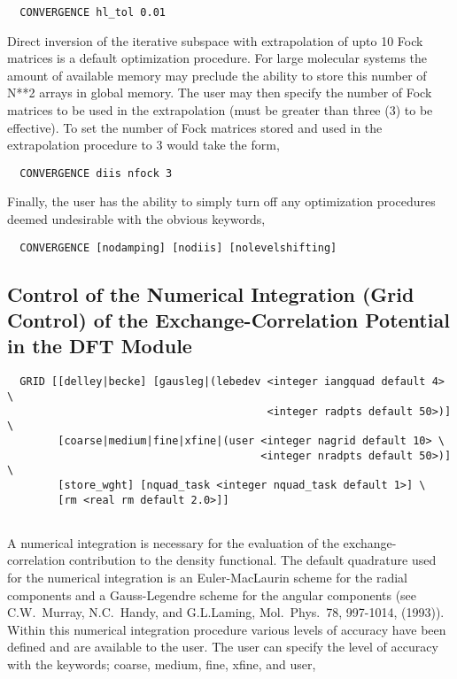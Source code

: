 \begin{verbatim}
  CONVERGENCE hl_tol 0.01
\end{verbatim}

Direct inversion of the iterative subspace with extrapolation of upto
10 Fock matrices is a default optimization procedure.  For large
molecular systems the amount of available memory may preclude the ability to
store this number of N**2 arrays in global memory.  The user may then
specify the number of Fock matrices to be used in the extrapolation
(must be greater than three (3) to be effective).  To set the number of
Fock matrices stored and used in the extrapolation procedure to 3
would take the form,

\begin{verbatim}
  CONVERGENCE diis nfock 3
\end{verbatim}

Finally, the user has the ability to simply turn off any optimization
procedures deemed undesirable with the obvious keywords,
\begin{verbatim}
  CONVERGENCE [nodamping] [nodiis] [nolevelshifting]
\end{verbatim}


\subsection{Control of the Numerical Integration (Grid Control) of the
  Exchange-Correlation Potential in the DFT Module}
\begin{verbatim}
  GRID [[delley|becke] [gausleg|(lebedev <integer iangquad default 4> \
                                         <integer radpts default 50>)] \
        [coarse|medium|fine|xfine|(user <integer nagrid default 10> \
                                        <integer nradpts default 50>)] \
        [store_wght] [nquad_task <integer nquad_task default 1>] \
        [rm <real rm default 2.0>]]


\end{verbatim}

A numerical integration is necessary for the evaluation of the
exchange-correlation contribution to the density functional.  The
default quadrature used for the numerical integration is an
Euler-MacLaurin scheme for the radial components and a Gauss-Legendre
scheme for the angular components (see C.W.~Murray, N.C.~Handy, and
G.L.Laming, Mol.~Phys.~78, 997-1014, (1993)).  Within this numerical 
integration procedure various levels of accuracy have been defined and
are available to the user.  The user can specify the level of accuracy
with the keywords; coarse, medium, fine, xfine, and user,


